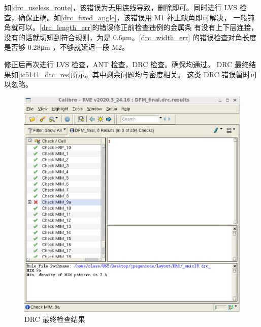 \documentclass[12pt,hyperref,a4paper,UTF8]{ctexart}
\begin{document}
如\autoref{drc_useless_route}，该错误为无用连线导致，删除即可。同时进行 LVS 
检查，确保正确。如\autoref{drc_fixed_angle}，该错误用 M1 补上缺角即可解决，
一般钝角就可以。\autoref{drc_length_err}的错误修正前检查违例的金属条
有没有上下层连接，没有的话就切短到符合规则，为是 0.6\unit{\um}。\autoref{drc_width_err}
的错误检查对角长度是否够 0.28\unit{\um} ，不够就延迟一段 M2。

修正后再次进行 LVS 检查，ANT 检查，DRC 检查。确保均通过。
DRC 最终结果如\autoref{ic5141_drc_res}所示。其中剩余问题均与密度相关。
这类 DRC 错误暂时可以忽略。

\begin{figure}[htbp]
    \centering
    \begin{minipage}{0.45\textwidth}
        \centering
        \includegraphics[width =1\textwidth]{figures/drc_results.png}
        \caption{DRC 最终检查结果}
        \label{ic5141_drc_res}
    \end{minipage}
    \quad
    \begin{minipage}{0.45\textwidth}
        \centering

\end{minipage}
\end{figure}
\end{document}
